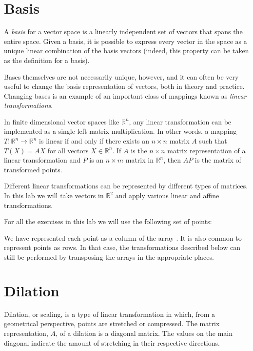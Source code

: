 \label{lab:ChangeBasis}


\section*{Basis}
A \emph{basis} for a vector space is a linearly independent set of vectors that spans the entire space. Given a basis, it is possible to express every vector in the space as a unique linear combination of the basis vectors (indeed, this property can be taken as the definition for a basis).

Bases themselves are not necessarily unique, however, and it can often be very useful to change the basis representation of vectors, both in theory and practice. Changing bases is an example of an important class of mappings known as \emph{linear transformations}.

In finite dimensional vector spaces like $\mathbb{R}^n$, any linear
transformation can be implemented as a single left matrix multiplication.
In other words, a mapping $T : \mathbb{R}^n \to \mathbb{R}^n$ is linear if and only if there exists an $n \times n$ matrix $A$ such that $T\left(X\right) = AX$ for all vectors $X \in \mathbb{R}^n$. If $A$ is the $n \times n$ matrix representation of a linear transformation and $P$ is an $n \times m$ matrix in $\mathbb{R}^n$, then $AP$ is the matrix of transformed points.

Different linear transformations can be represented by different types of matrices. In this lab we will take vectors in $\mathbb{R}^2$ and apply various linear and affine transformations.

For all the exercises in this lab we will use the following set of points:


We have represented each point as a column of the array .
It is also common to represent points as rows. In that case, the transformations described below can still be performed by transposing the arrays in the appropriate places.

\section*{Dilation}
Dilation, or scaling, is a type of linear transformation in which, from a geometrical perspective, points are stretched or compressed.
The matrix representation, $A$, of a dilation is a diagonal matrix. The values on the main diagonal indicate the amount of stretching in their respective directions.

